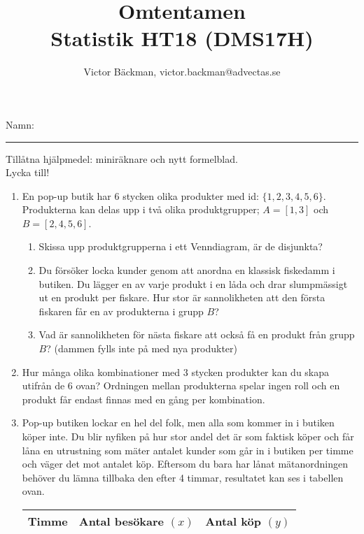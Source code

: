 \documentclass[a4paper,10pt]{article}
\title{Omtentamen\\ {Statistik HT18 (DMS17H)}}
\author{Victor Bäckman, victor.backman@advectas.se}
\begin{document}
\maketitle
\vspace{2cm}
Namn:
{\rule{13cm}{0.4pt}}
\vspace{5cm}
\begin{center}
  Tillåtna hjälpmedel: miniräknare och nytt formelblad.\\
    \vspace{3cm}
  {\huge Lycka till!}
\end{center}

\newpage
\begin{enumerate}
    \item{En pop-up butik har $6$ stycken olika produkter med id: $\{1, 2, 3, 4, 5, 6\}$. Produkterna kan delas upp i två olika produktgrupper; $A=[1, 3]$ och $B=[2, 4, 5, 6]$.}
    \begin{enumerate}
        \item{Skissa upp produktgrupperna i ett Venndiagram, är de disjunkta?}
        \vspace{8cm}
        \item{Du försöker locka kunder genom att anordna en klassisk fiskedamm i butiken. Du lägger en av varje produkt i en låda och drar slumpmässigt ut en produkt per fiskare. Hur stor är sannolikheten att den första fiskaren får en av produkterna i grupp $B$?}
        \newpage
        \item{Vad är sannolikheten för nästa fiskare att också få en produkt från grupp $B$? (dammen fylls inte på med nya produkter)}
    \end{enumerate}
    \newpage
    \item{Hur många olika kombinationer med $3$ stycken produkter kan du skapa utifrån de $6$ ovan? Ordningen mellan produkterna spelar ingen roll och en produkt får endast finnas med en gång per kombination.}
    \newpage
    \item{Pop-up butiken lockar en hel del folk, men alla som kommer in i butiken köper inte. Du blir nyfiken på hur stor andel det är som faktisk köper och får låna en utrustning som mäter antalet kunder som går in i butiken per timme och väger det mot antalet köp. Eftersom du bara har lånat mätanordningen behöver du lämna tillbaka den efter 4 timmar, resultatet kan ses i tabellen ovan.
    \begin{table}
        \centering
        \begin{tabular}[H]{c|c|c}
        \textbf{Timme} & \textbf{Antal besökare $(x)$}  & \textbf{Antal köp $(y)$}\\ \hline

\end{tabular}
\end{table}}
\end{enumerate}
\end{document}
